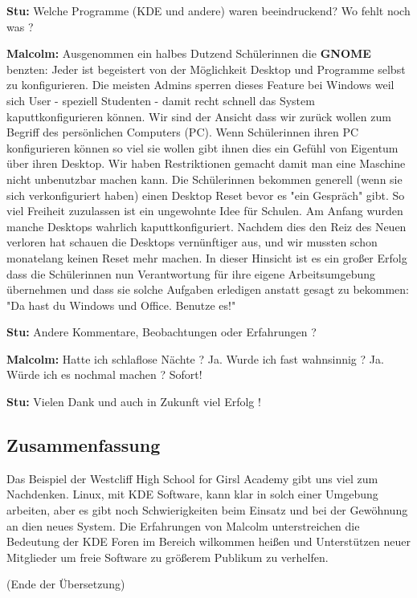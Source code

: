 \documentclass[10pt,a4paper,ngerman,twoside]{article} %
\begin{document}
\begin{multicols}{3}
\textbf{Stu:} Welche Programme (KDE und andere) waren beeindruckend? Wo fehlt noch was ?

\textbf{Malcolm:} Ausgenommen ein halbes Dutzend Schülerinnen die \textbf{GNOME} benzten: Jeder ist begeistert von der Möglichkeit Desktop und Programme selbst zu konfigurieren. Die meisten Admins sperren dieses Feature bei Windows weil sich User - speziell Studenten - damit recht schnell das System kaputtkonfigurieren können. Wir sind der Ansicht dass wir zurück wollen zum Begriff des persönlichen Computers (PC). Wenn Schülerinnen ihren PC konfigurieren können so viel sie wollen gibt ihnen dies ein Gefühl von Eigentum über ihren Desktop. Wir haben Restriktionen gemacht damit man eine Maschine nicht unbenutzbar machen kann. Die Schülerinnen bekommen generell (wenn sie sich verkonfiguriert haben) einen Desktop Reset bevor es "ein Gespräch" gibt. So viel Freiheit zuzulassen ist ein ungewohnte Idee für Schulen. Am Anfang wurden manche Desktops wahrlich kaputtkonfiguriert. Nachdem dies den Reiz des Neuen verloren hat schauen die Desktops vernünftiger aus, und wir mussten schon monatelang keinen Reset mehr machen. In dieser Hinsicht ist es ein großer Erfolg dass die Schülerinnen nun Verantwortung für ihre eigene Arbeitsumgebung übernehmen und dass sie solche Aufgaben erledigen anstatt gesagt zu bekommen: "Da hast du Windows und Office. Benutze es!"

\textbf{Stu:} Andere Kommentare, Beobachtungen oder Erfahrungen ? 

\textbf{Malcolm:} Hatte ich schlaflose Nächte ? Ja. Wurde ich fast wahnsinnig ? Ja. Würde ich es nochmal machen ? Sofort! 

\textbf{Stu:} Vielen Dank und auch in Zukunft viel Erfolg !



\subsection*{Zusammenfassung}

Das Beispiel der Westcliff High School for Girsl Academy gibt uns viel zum Nachdenken. Linux, mit KDE Software, kann klar in solch einer Umgebung arbeiten, aber es gibt noch Schwierigkeiten beim Einsatz und bei der Gewöhnung an dien neues System. Die Erfahrungen von Malcolm unterstreichen die Bedeutung der KDE Foren im Bereich wilkommen heißen und Unterstützen neuer Mitglieder um freie Software zu größerem Publikum zu verhelfen.

(Ende der Übersetzung)


\end{multicols}
\end{document}
